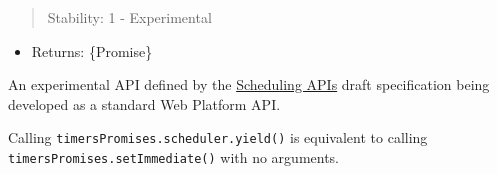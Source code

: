 \begin{quote}
Stability: 1 - Experimental
\end{quote}

\begin{itemize}
\tightlist
\item
  Returns: \{Promise\}
\end{itemize}

An experimental API defined by the
\href{https://github.com/WICG/scheduling-apis}{Scheduling APIs} draft
specification being developed as a standard Web Platform API.

Calling \texttt{timersPromises.scheduler.yield()} is equivalent to
calling \texttt{timersPromises.setImmediate()} with no arguments.
